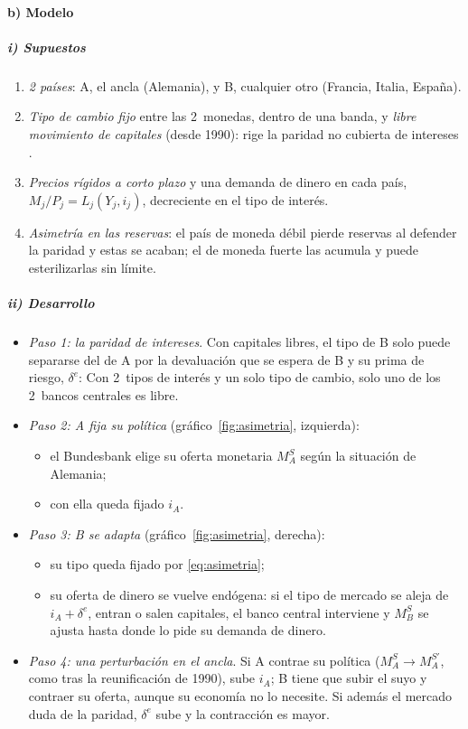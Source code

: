 \documentclass[11pt]{article}
\begin{document}
\paragraph{b) Modelo}

\subparagraph{i) Supuestos}

\begin{enumerate}
\item \emph{2 países}: A, el ancla (Alemania), y B, cualquier otro (Francia, Italia, España).
\item \emph{Tipo de cambio fijo} entre las 2~monedas, dentro de una banda, y \emph{libre movimiento de capitales} (desde 1990): rige la paridad no cubierta de intereses .
\item \emph{Precios rígidos a corto plazo} y una demanda de dinero en cada país, $M_j/P_j=L_j(Y_j,i_j)$, decreciente en el tipo de interés.
\item \emph{Asimetría en las reservas}: el país de moneda débil pierde reservas al defender la paridad y estas se acaban; el de moneda fuerte las acumula y puede esterilizarlas sin límite.
\end{enumerate}

\subparagraph{ii) Desarrollo}

\begin{itemize}
\item \emph{Paso 1: la paridad de intereses}. Con capitales libres, el tipo de B solo puede separarse del de A por la devaluación que se espera de B y su prima de riesgo, $\delta^e$:
  Con 2~tipos de interés y un solo tipo de cambio, solo uno de los 2~bancos centrales es libre.
\item \emph{Paso 2: A fija su política} (gráfico~\ref{fig:asimetria}, izquierda):
  \begin{itemize}
  \item el Bundesbank elige su oferta monetaria $M^S_A$ según la situación de Alemania;
  \item con ella queda fijado $i_A$.
  \end{itemize}
\item \emph{Paso 3: B se adapta} (gráfico~\ref{fig:asimetria}, derecha):
  \begin{itemize}
  \item su tipo queda fijado por \eqref{eq:asimetria};
  \item su oferta de dinero se vuelve endógena: si el tipo de mercado se aleja de $i_A+\delta^e$, entran o salen capitales, el banco central interviene y $M^S_B$ se ajusta hasta donde lo pide su demanda de dinero.
  \end{itemize}
\item \emph{Paso 4: una perturbación en el ancla}. Si A contrae su política ($M^S_A\to M^{S\prime}_A$, como tras la reunificación de 1990), sube $i_A$; B tiene que subir el suyo y contraer su oferta, aunque su economía no lo necesite. Si además el mercado duda de la paridad, $\delta^e$ sube y la contracción es mayor.
\end{itemize}
\end{document}
